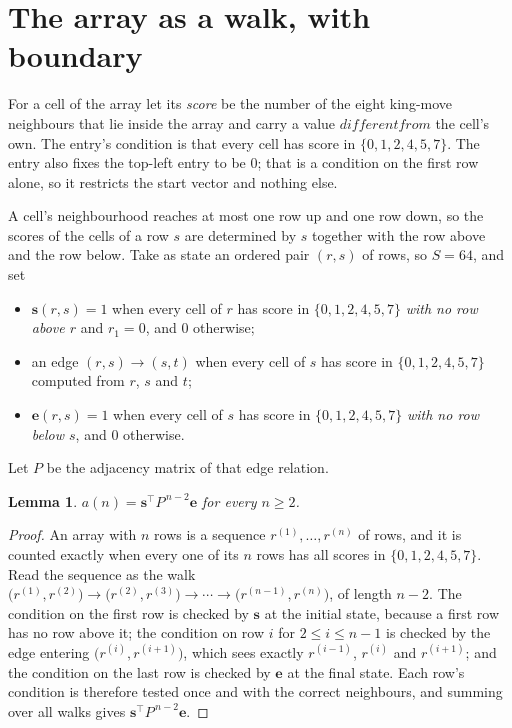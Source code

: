\documentclass[11pt,a4paper]{article}
\theoremstyle{plain}
\newtheorem{lemma}[theorem]{Lemma}
\theoremstyle{definition}
\begin{document}
\section{The array as a walk, with boundary}

For a cell of the array let its \emph{score} be the number of the eight king-move neighbours that lie inside
the array and carry a value $different from$ the cell's own. The entry's condition is that every cell
has score in $\{0,1,2,4,5,7\}$. The entry also fixes the top-left entry to be $0$; that is a condition on the first row alone, so it restricts the start vector and nothing else.

A cell's neighbourhood reaches at most one row up and one row down, so the scores of the
cells of a row $s$ are determined by $s$ together with the row above and the row below.
Take as state an ordered pair $(r,s)$ of rows, so $S=64$, and set
\begin{itemize}
\item $\mathbf{s}(r,s)=1$ when every cell of $r$ has score in $\{0,1,2,4,5,7\}$ \emph{with no row
above $r$} and $r_1=0$, and $0$ otherwise;
\item an edge $(r,s)\to(s,t)$ when every cell of $s$ has score in $\{0,1,2,4,5,7\}$ computed from
$r$, $s$ and $t$;
\item $\mathbf{e}(r,s)=1$ when every cell of $s$ has score in $\{0,1,2,4,5,7\}$ \emph{with no row
below $s$}, and $0$ otherwise.
\end{itemize}
Let $P$ be the adjacency matrix of that edge relation.

\begin{lemma}\label{lem:walk}
$a(n)=\mathbf{s}^{\!\top}P^{\,n-2}\mathbf{e}$ for every $n\ge2$.
\end{lemma}

\begin{proof}
An array with $n$ rows is a sequence $r^{(1)},\dots,r^{(n)}$ of rows, and it is counted
exactly when every one of its $n$ rows has all scores in $\{0,1,2,4,5,7\}$. Read the sequence as the
walk $\bigl(r^{(1)},r^{(2)}\bigr)\to\bigl(r^{(2)},r^{(3)}\bigr)\to\cdots\to
\bigl(r^{(n-1)},r^{(n)}\bigr)$, of length $n-2$. The condition on the first row is
checked by $\mathbf{s}$ at the initial state, because a first row has no row above it; the
condition on row $i$ for $2\le i\le n-1$ is checked by the edge entering
$\bigl(r^{(i)},r^{(i+1)}\bigr)$, which sees exactly $r^{(i-1)}$, $r^{(i)}$ and
$r^{(i+1)}$; and the condition on the last row is checked by $\mathbf{e}$ at the final
state. Each row's condition is therefore tested once and with the correct neighbours, and
summing over all walks gives $\mathbf{s}^{\!\top}P^{\,n-2}\mathbf{e}$.
\end{proof}
\end{document}
